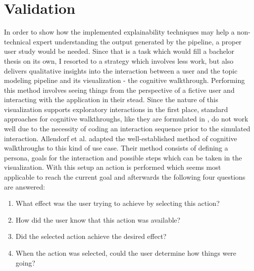 %
\chapter{Validation}
\label{chap:validation}

In order to show how the implemented explainability techniques may help a non-technical expert understanding the output generated by the pipeline, a proper user study would be needed. Since that is a task which would fill a bachelor thesis on its own, I resorted to a strategy which involves less work, but also delivers qualitative insights into the interaction between a user and the topic modeling pipeline and its visualization - the cognitive walkthrough. Performing this method involves seeing things from the perspective of a fictive user and interacting with the application in their stead.
Since the nature of this visualization supports exploratory interactions in the first place, standard approaches for cognitive walkthroughs, like they are formulated in \cite{whartonUsabilityInspectionMethods1994}, do not work well due to the necessity of coding an interaction sequence prior to the simulated interaction. Allendorf et al. \cite{allendoerferAdaptingCognitiveWalkthrough2005} adapted the well-established method of cognitive walkthroughs to this kind of use case. Their method consists of defining a persona, goals for the interaction and possible steps which can be taken in the visualization. With this setup an action is performed which seems most applicable to reach the current goal and afterwards the following four questions are answered:
\begin{enumerate}
	\item What effect was the user trying to achieve by selecting this action?
	\item How did the user know that this action was available?
	\item Did the selected action achieve the desired effect?
	\item When the action was selected, could the user determine how things were going?
\end{enumerate}

